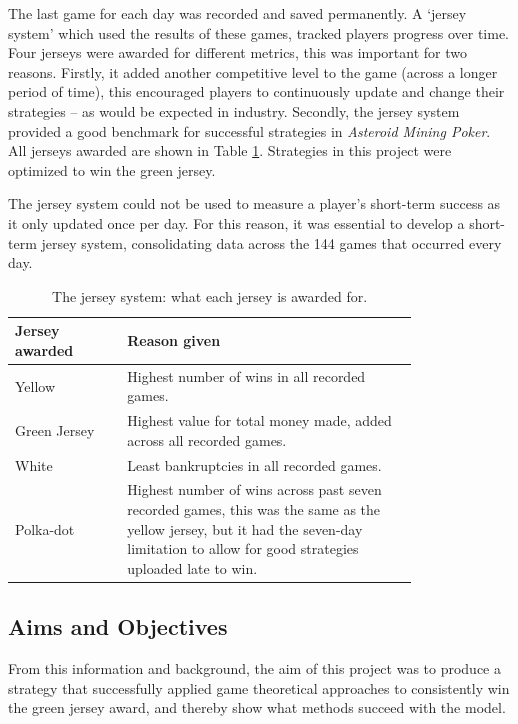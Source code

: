 \documentclass[11pt, twoside]{article}
\begin{document}
The last game for each day was recorded and saved permanently. A ‘jersey system’ which used the results of these games, tracked players progress over time. Four jerseys were awarded for different metrics, this was important for two reasons. Firstly, it added another competitive level to the game (across a longer period of time), this encouraged players to continuously update and change their strategies -- as would be expected in industry. Secondly, the jersey system provided a good benchmark for successful strategies in \textit{Asteroid Mining Poker}. All jerseys awarded are shown in Table \ref{tab:jersey}. Strategies in this project were optimized to win the green jersey.

The jersey system could not be used to measure a player's short-term success as it only updated once per day. For this reason, it was essential to develop a short-term jersey system, consolidating data across the 144 games that occurred every day.

\begin{table}[b!]
	\centering
	\caption{The jersey system: what each jersey is awarded for.}
	\label{tab:jersey}
	\begin{tabular}{p{0.22\linewidth}>{\raggedright\arraybackslash}p{0.58\linewidth}}
		\toprule
		\textbf{Jersey awarded} & \textbf{Reason given} \\
		\midrule
		Yellow & Highest number of wins in all recorded games. \\
		Green Jersey & Highest value for total money made, added across all recorded games. \\
		White & Least bankruptcies in all recorded games. \\
		Polka-dot & Highest number of wins across past seven recorded games, this was the same as the yellow jersey, but it had the seven-day limitation to allow for good strategies uploaded late to win. \\
		\bottomrule
	\end{tabular}
\end{table}

\subsection{Aims and Objectives} \label{sec:aims}
From this information and background, the aim of this project was to produce a strategy that successfully applied game theoretical approaches to consistently win the green jersey award, and thereby show what methods succeed with the model.
\end{document}
